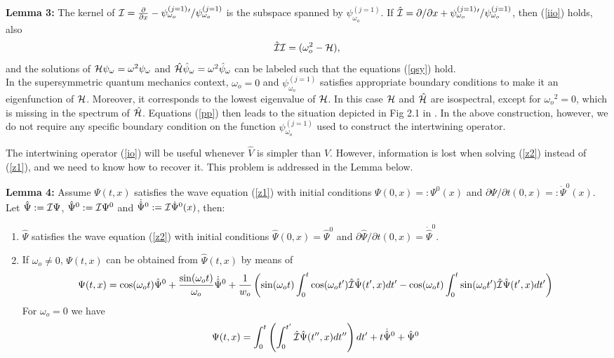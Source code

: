 \documentclass[aps,floats,showpacs,amssymb,tightenlines]{revtex4}
\def\w{\omega}
\def\p{\partial}
\def\I{{\cal I}}
\def\po{\psi_{\w_o}}
\def\pe{\psi_{\w_o}^{(j=1)}{}}
\begin{document}
\noindent
{\bf Lemma 3:}  The kernel of $\I = \frac{\p}{\p x} - \psi _{\w_o}^{(j=1)} {}' / \psi _{\w_o}^{(j=1)}$
is the subspace spanned by $\po ^{(j=1)}$.  If $ \hat \I  =  \p/\p x +
 \psi _{\w_o}^{(j=1)} {}' / \psi _{\w_o}^{(j=1)}$, then (\ref{iio}) holds, also
 \begin{equation} \label{inverse}
 \hat \I \I = (\w_o^2 - {\cal H}),
\end{equation}
  and  the solutions of ${\cal H} \psi_{\w} = \w^2 \psi_{\w}$ and $\hat {\cal H} \hat \psi_{\w} = \w^2 \hat \psi_{\w}$
can be labeled such that the equations (\ref{qsy}) hold.\\

In the supersymmetric quantum mechanics context, $\w_o=0$ and $\psi _{\w_o}^{(j=1)}$ satisfies appropriate boundary conditions to make it
 an eigenfunction of ${\cal H}$. Moreover, it  corresponds to the lowest eigenvalue of ${\cal H}$.
In this case  ${\cal H}$ and $\hat {\cal H}$ are isospectral, except for $\w_o{}^2=0$, which is missing in the spectrum of $\hat {\cal H}$.
 Equations (\ref{pp}) then leads to the situation
depicted in Fig 2.1 in \cite{cooper}. In the above construction, however, we do not require any specific boundary condition
on the function $\pe$ used to construct the intertwining operator.


\vspace{.3cm}

The intertwining  operator (\ref{io}) will be useful whenever  $\hat V$ is simpler than
$V$. However, information is lost when solving (\ref{z2}) instead of (\ref{z1}), and we need
to know how to recover it. This problem is addressed in the Lemma below.

\vspace{.3cm}

\noindent
{\bf Lemma 4:} Assume $\Psi(t,x)$ satisfies the wave equation (\ref{z1}) with initial conditions $\Psi(0,x)=: \Psi^0(x)$
 and $\p \Psi / \p t (0,x)=: \dot \Psi^0(x)$.
 Let $\hat \Psi := \I \Psi$,  $\hat \Psi ^0 := \I \Psi ^0$ and $\dot{\hat{\Psi}}^0 := \I  \dot \Psi^0(x)$, then:
 \begin{enumerate}
\item $\hat \Psi$ satisfies the wave equation (\ref{z2}) with
initial conditions $\hat \Psi(0,x)=\hat \Psi ^0$ and $\p \hat \Psi / \p t (0,x)= \dot{\hat{\Psi}}^0$.
\item If $\w_o \neq 0$, $\Psi(t,x)$ can be obtained from $\hat \Psi (t,x)$ by means of
\begin{multline} \label{sol}
 \Psi(t,x) =  \cos (\w_o t) \hat \Psi ^0 + \frac{\sin (\w_o t)}{\w_o} \dot{\hat{\Psi}}^0
+ \frac{1}{w_o} \left(
\sin (\w_o t) \int_0^t \cos (\w_o t') \hat \I \hat \Psi(t',x) dt' -\cos (\w_o t) \int_0^t \sin (\w_o t') \hat \I \hat \Psi(t',x) dt' \right)
\end{multline}
For  $\w_o = 0$ we have
\begin{equation}  \label{sol2}
\Psi(t,x) = \int_0^t \left( \int_0^{t'} \hat \I \hat \Psi(t'',x) dt'' \right) dt' + t \dot{\hat{\Psi}}^0  + \hat \Psi ^0
\end{equation}
\end{enumerate}
\vspace{.3cm}
\end{document}
